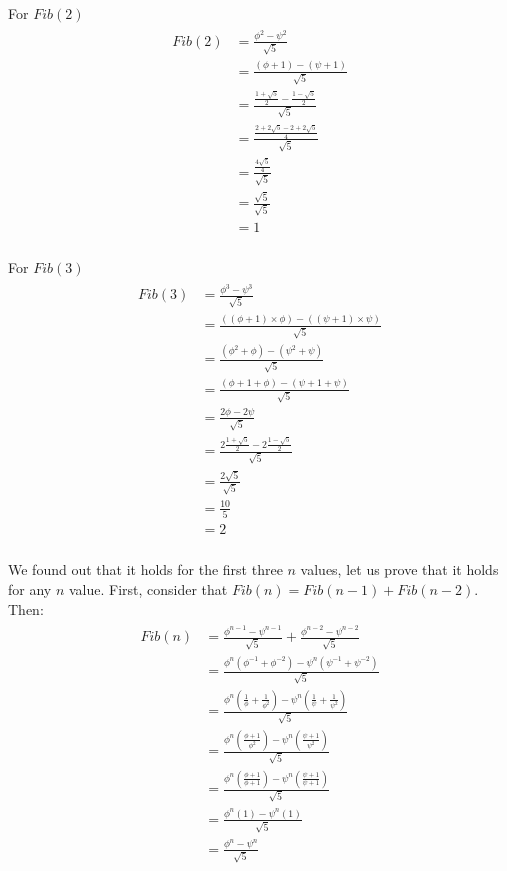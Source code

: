 \documentclass[paper=a4, fontsize=11pt]{scrartcl} %
\numberwithin{equation}{section} %
\numberwithin{figure}{section} %
\numberwithin{table}{section} %
\begin{document}
For $Fib(2)$
\begin{align}
  \begin{split}
    Fib(2) &=\frac{\phi^2 - \psi^2}{\sqrt5}\\
    &= \frac{(\phi+1) - (\psi + 1)}{\sqrt5}\\
    &= \frac{\frac{1+\sqrt5}{2}-\frac{1-\sqrt5}{2}}{\sqrt5}\\
    &= \frac{\frac{2+2\sqrt5-2+2\sqrt5}{4}}{\sqrt5}\\
    &= \frac{\frac{4\sqrt5}{4}}{\sqrt5}\\
    &= \frac{\sqrt5}{\sqrt5}\\
    &= 1\\
  \end{split}
\end{align}

For $Fib(3)$
\begin{align}
  \begin{split}
    Fib(3) &=\frac{\phi^3 - \psi^3}{\sqrt5}\\
    &= \frac{((\phi + 1) \times \phi) - ((\psi + 1) \times \psi)}{\sqrt5}\\
    &= \frac{(\phi^2 + \phi) - (\psi^2 + \psi)}{\sqrt5}\\
    &= \frac{(\phi + 1 + \phi) - (\psi + 1 + \psi)}{\sqrt5}\\
    &= \frac{2\phi - 2\psi}{\sqrt5}\\
    &= \frac{2\frac{1+\sqrt5}{2} - 2\frac{1-\sqrt5}{2}}{\sqrt5}\\
    &= \frac{2\sqrt5}{\sqrt5}\\
    &= \frac{10}{5}\\
    &= 2\\
  \end{split}
\end{align}

We found out that it holds for the first three $n$ values, let us prove that it holds for any $n$ value. First, consider that $Fib(n) = Fib(n-1) + Fib(n-2)$. Then:\\

\begin{align}
  \begin{split}
    Fib(n) &=\frac{\phi^{n-1} - \psi^{n-1}}{\sqrt5} + \frac{\phi^{n-2} - \psi^{n-2}}{\sqrt5}\\
    &=\frac{\phi^n (\phi^{-1} + \phi^{-2}) - \psi^n (\psi^{-1} + \psi^{-2})}{\sqrt5} \\
    &=\frac{\phi^n (\frac{1}{\phi} + \frac{1}{\phi^2}) - \psi^n (\frac{1}{\psi} + \frac{1}{\psi^2})}{\sqrt5} \\
    &=\frac{\phi^n (\frac{\phi+1}{\phi^2}) - \psi^n (\frac{\psi+1}{\psi^2})}{\sqrt5} \\
    &=\frac{\phi^n (\frac{\phi+1}{\phi+1}) - \psi^n (\frac{\psi+1}{\psi+1})}{\sqrt5} \\
    &=\frac{\phi^n (1) - \psi^n (1)}{\sqrt5} \\
    &=\frac{\phi^n - \psi^n}{\sqrt5} \\
  \end{split}
\end{align}\\
\end{document}
